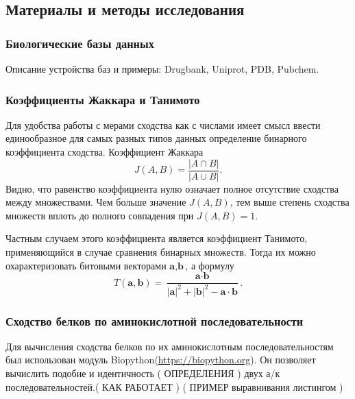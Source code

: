 \documentclass[a4paper,14pt]{article}         %
\begin{document}
\subsection{Материалы и методы исследования}
\subsubsection{Биологические базы данных}
\color{orange} Описание устройства баз и примеры: Drugbank, Uniprot, PDB, Pubchem. \color{black}
\subsubsection{Коэффициенты Жаккара и Танимото}
Для удобства работы с мерами сходства как с числами имеет смысл ввести единообразное для самых разных типов данных определение бинарного коэффициента сходства. Коэффициент Жаккара %
\begin{equation}
\label{jaccard}
J(A, B) = \frac{|A\cap B|}{|A\cup B|}.
\end{equation}
Видно, что равенство коэффициента нулю означает полное отсутствие сходства между множествами. Чем больше значение $J(A, B)$, тем выше степень сходства множеств вплоть до полного совпадения при $J(A, B) = 1$.

Частным случаем этого коэффициента является коэффициент Танимото, применяющийся в случае сравнения бинарных множеств. Тогда их можно охарактеризовать битовыми векторами $\textbf{a}, \textbf{b}$, а формулу %
\begin{equation}
T(\textbf{a}, \textbf{b}) = \frac{\textbf{a}\cdot\textbf{b}}{|\textbf{a}|^2 + |\textbf{b}|^2 - \textbf{a}\cdot\textbf{b}}.
\end{equation}

\subsubsection{Сходство белков по аминокислотной последовательности}
Для вычисления сходства белков по их аминокислотным последовательностям был использован модуль Biopython(\href{https://biopython.org/}{https://biopython.org}). Он позволяет вычислить подобие и идентичность (\color{orange} ОПРЕДЕЛЕНИЯ \color{black}) двух а/к последовательностей.(\color{orange} КАК РАБОТАЕТ \color{black}) (\color{orange} ПРИМЕР выравнивания листингом \color{black}) 
\end{document}
